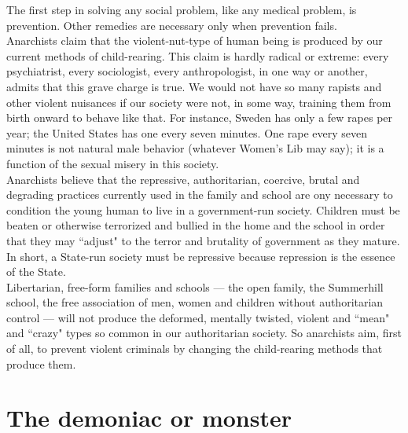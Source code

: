 The first step in solving any social problem, like any medical problem, is prevention. Other remedies are necessary only when prevention fails.\\
Anarchists claim that the violent-nut-type of human being is produced by our current methods of child-rearing. This claim is hardly radical or extreme: every psychiatrist, every sociologist, every anthropologist, in one way or another, admits that this grave charge is true. We would not have so many rapists and other violent nuisances if our society were not, in some way, training them from birth onward to behave like that. For instance, Sweden has only a few rapes per year; the United States has one every seven minutes. One rape every seven minutes is not natural male behavior (whatever Women's Lib may say); it is a function of the sexual misery in this society.\\
Anarchists believe that the repressive, authoritarian, coercive, brutal and degrading practices currently used in the family and school are ony necessary to condition the young human to live in a government-run society. Children must be beaten or otherwise terrorized and bullied in the home and the school in order that they may ``adjust" to the terror and brutality of government as they mature. In short, a State-run society must be repressive because repression is the essence of the State.\\
Libertarian, free-form families and schools --- the open family, the Summerhill school, the free association of men, women and children without authoritarian control --- will not produce the deformed, mentally twisted, violent and ``mean" and ``crazy" types so common in our authoritarian society. So anarchists aim, first of all, to prevent violent criminals by changing the child-rearing methods that produce them.

\section*{The demoniac or monster}

